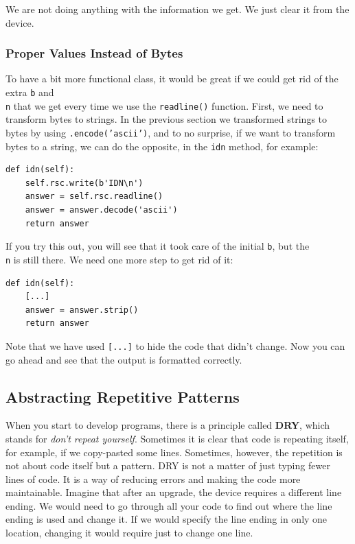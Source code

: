 We are not doing anything with the information we get. We just clear it from the device.

\subsubsection{Proper Values Instead of Bytes}
To have a bit more functional class, it would be great if we could get rid of the extra \texttt{b} and \texttt{\\n} that we get every time we use the \texttt{readline()} function. First, we need to transform bytes to strings. In the previous section we transformed strings to bytes by using \texttt{.encode('ascii')}, and to no surprise, if we want to transform bytes to a string, we can do the opposite, in the \texttt{idn} method, for example:

\begin{verbatim}
def idn(self):
    self.rsc.write(b'IDN\n')
    answer = self.rsc.readline()
    answer = answer.decode('ascii')
    return answer
\end{verbatim}

If you try this out, you will see that it took care of the initial \texttt{b}, but the \texttt{\\n} is still there. We need one more step to get rid of it:

\begin{verbatim}
def idn(self):
    [...]
    answer = answer.strip()
    return answer
\end{verbatim}

Note that we have used %
\texttt{[...]} to hide the code that didn't change. Now you can go ahead and see that the output is formatted correctly.


\subsection{Abstracting Repetitive Patterns}\label{subsec:abstracting-repetitive-patterns}
When you start to develop programs, there is a principle called \textbf{DRY}, which stands for \emph{don't repeat yourself}. Sometimes it is clear that code is repeating itself, for example, if we copy-pasted some lines. Sometimes, however, the repetition is not about code itself but a pattern. {DRY} is not a matter of just typing fewer lines of code. It is a way of reducing errors and making the code more maintainable. Imagine that after an upgrade, the device requires a different line ending. We would need to go through all your code to find out where the line ending is used and change it. If we would specify the line ending in only one location, changing it would require just to change one line.

